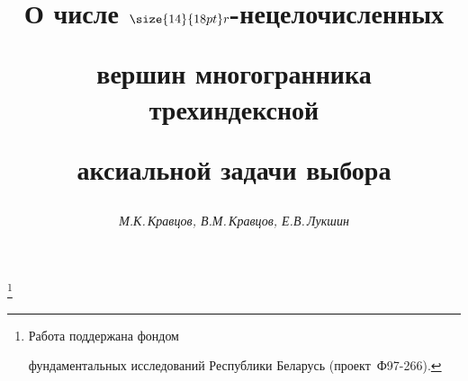 






\newcommand{\tts}[1]{}







\setcounter{page}{89}















\author{\it М.К.\,Кравцов, В.М.\,Кравцов, Е.В.\,Лукшин}




\title{О числе $\size{14}{18pt}\selectfont r$-нецелочисленных


вершин многогранника трехиндексной


аксиальной задачи выбора}


\thanks{Работа поддержана фондом


фундаментальных исследований Республики Беларусь (проект \No\,Ф97-266).}





\date{}




\pagestyle{plain} %







\maketitle


